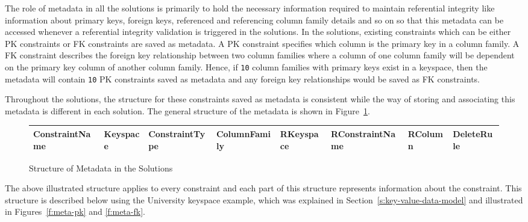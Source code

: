 The role of metadata in all the solutions is primarily to hold the necessary
 information required to maintain referential integrity like information about
 primary keys, foreign keys, referenced and referencing column family details
 and so on so that this metadata can be accessed whenever a referential
 integrity validation is triggered in the solutions.  
In the solutions, existing constraints which can be either \ac{PK} constraints
or \ac{FK} constraints are saved as metadata.  A \ac{PK} constraint specifies
which column is the primary key in a column family.  A \ac{FK} constraint
describes the foreign key relationship between two column families where a
column of one column family will be dependent on the primary key column of another
column family.  Hence, if \texttt{10} column families with primary keys exist in
a keyspace, then the metadata will contain \texttt{10} \ac{PK} constraints saved
as metadata and any foreign key relationships would be saved as \ac{FK}
constraints. 

 Throughout the solutions,
 the structure for these constraints saved as metadata  is consistent while
 the way of storing and associating this metadata is different
in each solution.  The general structure of the metadata is shown in
Figure~\ref{f:meta-struc}. \\

\begin{figure}[h]
	\centering
	\begin{tabular}{|CCC CCC CC}
		\hline
		ConstraintName & Keyspace & ConstraintType & ColumnFamily & RKeyspace &
		RConstraintName & RColumn & DeleteRule\\
		\hline
	\end{tabular}
	\caption{Structure of Metadata in the Solutions}\label{f:meta-struc}
\end{figure}


 The above illustrated structure applies to every
constraint and each part of this structure represents information about the
constraint. This structure is described below using the University
keyspace example, which was explained in Section~\ref{s:key-value-data-model}
and illustrated  in Figures~\ref{f:meta-pk}
and \ref{f:meta-fk}. 

